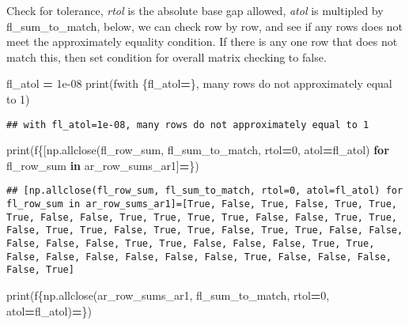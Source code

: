 \documentclass[
]{book}
\newenvironment{Shaded}{\begin{snugshade}}{\end{snugshade}}
\newcommand{\BuiltInTok}[1]{#1}
\newcommand{\ControlFlowTok}[1]{\textcolor[rgb]{0.13,0.29,0.53}{\textbf{#1}}}
\newcommand{\DecValTok}[1]{\textcolor[rgb]{0.00,0.00,0.81}{#1}}
\newcommand{\FloatTok}[1]{\textcolor[rgb]{0.00,0.00,0.81}{#1}}
\newcommand{\KeywordTok}[1]{\textcolor[rgb]{0.13,0.29,0.53}{\textbf{#1}}}
\newcommand{\NormalTok}[1]{#1}
\newcommand{\OperatorTok}[1]{\textcolor[rgb]{0.81,0.36,0.00}{\textbf{#1}}}
\newcommand{\SpecialCharTok}[1]{\textcolor[rgb]{0.00,0.00,0.00}{#1}}
\newcommand{\SpecialStringTok}[1]{\textcolor[rgb]{0.31,0.60,0.02}{#1}}
\begin{document}
Check for tolerance, \emph{rtol} is the absolute base gap allowed, \emph{atol} is multipled by fl\_sum\_to\_match, below, we can check row by row, and see if any rows does not meet the approximately equality condition. If there is any one row that does not match this, then set condition for overall matrix checking to false.

\begin{Shaded}
\begin{Highlighting}[]
\NormalTok{fl\_atol }\OperatorTok{=} \FloatTok{1e{-}08}
\BuiltInTok{print}\NormalTok{(}\SpecialStringTok{f\textquotesingle{}with }\SpecialCharTok{\{}\NormalTok{fl\_atol}\OperatorTok{=}\SpecialCharTok{\}}\SpecialStringTok{, many rows do not approximately equal to 1\textquotesingle{}}\NormalTok{)}
\end{Highlighting}
\end{Shaded}

\begin{verbatim}
## with fl_atol=1e-08, many rows do not approximately equal to 1
\end{verbatim}

\begin{Shaded}
\begin{Highlighting}[]
\BuiltInTok{print}\NormalTok{(}\SpecialStringTok{f\textquotesingle{}}\SpecialCharTok{\{}\NormalTok{[np.allclose(fl\_row\_sum, fl\_sum\_to\_match, rtol}\OperatorTok{=}\DecValTok{0}\NormalTok{, atol}\OperatorTok{=}\NormalTok{fl\_atol) }\ControlFlowTok{for}\NormalTok{ fl\_row\_sum }\KeywordTok{in}\NormalTok{ ar\_row\_sums\_ar1]}\OperatorTok{=}\SpecialCharTok{\}}\SpecialStringTok{\textquotesingle{}}\NormalTok{)}
\end{Highlighting}
\end{Shaded}

\begin{verbatim}
## [np.allclose(fl_row_sum, fl_sum_to_match, rtol=0, atol=fl_atol) for fl_row_sum in ar_row_sums_ar1]=[True, False, True, False, True, True, True, False, False, True, True, True, True, False, False, True, True, False, True, True, False, True, True, False, True, True, False, False, False, False, False, True, True, False, False, False, True, True, False, False, False, False, False, False, True, False, False, False, False, True]
\end{verbatim}

\begin{Shaded}
\begin{Highlighting}[]
\BuiltInTok{print}\NormalTok{(}\SpecialStringTok{f\textquotesingle{}}\SpecialCharTok{\{np.}\NormalTok{allclose(ar\_row\_sums\_ar1, fl\_sum\_to\_match, rtol}\OperatorTok{=}\DecValTok{0}\NormalTok{, atol}\OperatorTok{=}\NormalTok{fl\_atol)}\OperatorTok{=}\SpecialCharTok{\}}\SpecialStringTok{\textquotesingle{}}\NormalTok{)}
\end{Highlighting}
\end{Shaded}
\end{document}
